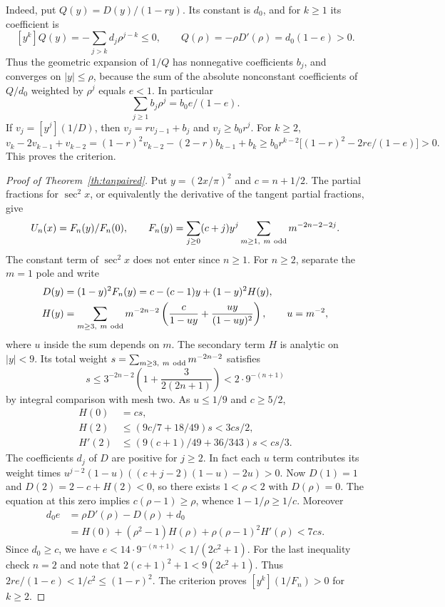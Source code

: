 \documentclass[11pt,a4paper]{article}
\numberwithin{equation}{section}
\begin{document}
Indeed, put $Q(y)=D(y)/(1-r y)$. Its constant is $d_0$, and
for $k\ge1$ its coefficient is
\[
 [y^k]Q(y)=-\sum_{j>k}d_j\rho^{j-k}\le0,
 \qquad Q(\rho)=-\rho D'(\rho)=d_0(1-e)>0.
\]
Thus the geometric expansion of $1/Q$ has nonnegative coefficients
$b_j$, and converges on $|y|\le\rho$, because the sum of the
absolute nonconstant coefficients of $Q/d_0$ weighted by $\rho^j$
equals $e<1$. In particular
\[
  \sum_{j\ge1}b_j\rho^j=b_0e/(1-e).
\]
If $v_j=[y^j](1/D)$, then $v_j=rv_{j-1}+b_j$ and
$v_j\ge b_0 r^j$. For $k\ge2$,
\[
 v_k-2v_{k-1}+v_{k-2}
   =(1-r)^2v_{k-2}-(2-r)b_{k-1}+b_k
   \ge b_0r^{k-2}\bigl[(1-r)^2-2r e/(1-e)\bigr]>0.
\]
This proves the criterion.

\begin{proof}[Proof of Theorem~\ref{th:tanpaired}]
Put $y=(2x/\pi)^2$ and $c=n+1/2$. The partial fractions for
$\sec^2 x$, or equivalently the derivative of the tangent
partial fractions, give
\[
 U_n(x)=F_n(y)/F_n(0),\qquad
 F_n(y)=\sum_{j\ge0}(c+j)y^j
             \sum_{m\ge1,\ m\ {\rm odd}}m^{-2n-2-2j}.
\]
The constant term of $\sec^2x$ does not enter since $n\ge1$.
For $n\ge2$, separate the $m=1$ pole and write
\[
 \begin{aligned}
 D(y)&=(1-y)^2F_n(y)=c-(c-1)y+(1-y)^2H(y),\\
 H(y)&=\sum_{m\ge3,\ m\ {\rm odd}}m^{-2n-2}
     \left(\frac{c}{1-uy}+\frac{uy}{(1-uy)^2}\right),\qquad u=m^{-2},
 \end{aligned}
\]
where $u$ inside the sum depends on $m$. The secondary term $H$ is
analytic on $|y|<9$. Its total weight $s=\sum_{m\ge3,\ m\ {\rm odd}}m^{-2n-2}$
satisfies
\[
 s\le3^{-2n-2}\left(1+\frac{3}{2(2n+1)}\right)
     < 2\cdot 9^{-(n+1)}
\]
by integral comparison with mesh two. As $u\le1/9$ and $c\ge5/2$,
\[
 \begin{split}
 H(0)&=cs,\\
 H(2)&\le(9c/7+18/49)s<3cs/2,\\
 H'(2)&\le(9(c+1)/49+36/343)s<cs/3.
 \end{split}
\]
The coefficients $d_j$ of $D$ are positive for $j\ge2$. In fact
each $u$ term contributes its weight times
$u^{j-2}(1-u)((c+j-2)(1-u)-2u)>0$.
Now $D(1)=1$ and $D(2)=2-c+H(2)<0$, so there exists
$1<\rho<2$ with $D(\rho)=0$.
The equation at this zero implies $c(\rho-1)\ge\rho$, whence
$1-1/\rho\ge1/c$. Moreover
\[
 \begin{split}
 d_0 e &= \rho D'(\rho)-D(\rho)+d_0\\
 &= H(0)+(\rho^2-1)H(\rho)+\rho(\rho-1)^2H'(\rho)
   <7cs.
 \end{split}
\]
Since $d_0\ge c$, we have $e<14\cdot9^{-(n+1)}<1/(2c^2+1)$.
For the last inequality check $n=2$ and note that
$2(c+1)^2+1<9(2c^2+1)$. Thus
$2r e/(1-e)<1/c^2\le(1-r)^2$. The criterion proves
$[y^k](1/F_n)>0$ for $k\ge2$.


\end{proof}
\end{document}
